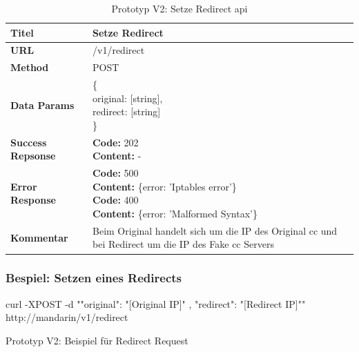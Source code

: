 \begin{table}[H]
    \centering
	\begin{tabularx}{\textwidth}{| l | X |}
        \hline
        \textbf{Titel} & Setze Redirect \\\hline        
        \textbf{URL} & /v1/redirect \\ \hline
        \textbf{Method} & POST\\ \hline
        \textbf{Data Params} & \pbox{30cm}{\vspace{3mm} \{\\original: [string], \\ redirect: [string]\\ \} \vspace{3mm}}\\ \hline
        \textbf{Success Repsonse} & \pbox{30cm}{\vspace{3mm} \textbf{Code:} 202 \\ \textbf{Content:} - \vspace{3mm}}\\ \hline
        \textbf{Error Response} & \pbox{30cm}{\vspace{3mm} \textbf{Code:} 500 \\ \textbf{Content:} \{error: 'Iptables error'\} \\
        \textbf{Code:} 400 \\ \textbf{Content:} \{error: 'Malformed Syntax'\} \vspace{3mm}}\\ \hline
        \textbf{Kommentar} & Beim Original handelt sich um die IP des Original \gls{cc} und bei Redirect um die IP des Fake \gls{cc} Servers \\ \hline
    \end{tabularx}
    \caption{Prototyp V2: Setze Redirect \gls{api}}
\end{table}



\begin{listing}[H]
\subsubsection{Bespiel: Setzen eines Redirects}
\begin{fancycode}
curl -XPOST -d "{"original": "[Original IP]" , "redirect": "[Redirect IP]"}" http://mandarin/v1/redirect
\end{fancycode}
\caption{Prototyp V2: Beispiel für Redirect Request}
\label{lst:mandarin-request}
\end{listing}



